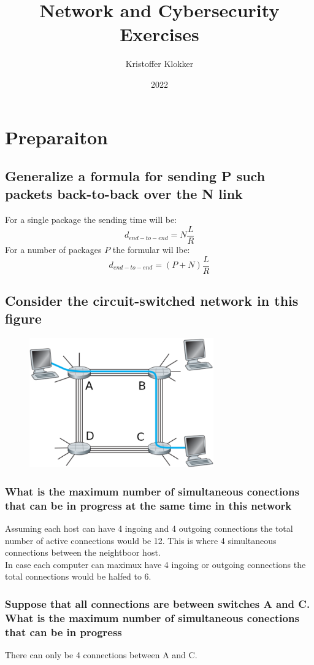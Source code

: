 \documentclass[12pt, a4paper]{article}
\title{Network and Cybersecurity\\ Exercises}
\date{2022}
\author{Kristoffer Klokker}
\begin{document}
	\maketitle
	\clearpage
	\tableofcontents
	\clearpage
	\section{Preparaiton}
		\subsection{Generalize a formula for sending P such packets back-to-back over the N link}
			For a single package the sending time will be:
			$$d_{end-to-end}=N\frac{L}{R}$$
			For a number of packages $P$ the formular wil lbe:
			$$d_{end-to-end}=(P+N)\frac{L}{R}$$
		\subsection{Consider the circuit-switched network in this figure}
			\begin{figure}[h!]
				\includegraphics[width=300px]{assets/1.1.png}
				\center
			\end{figure}
			\subsubsection{What is the maximum number of simultaneous conections that can be in progress at the same time in this network}
				Assuming each host can have 4 ingoing and 4 outgoing connections the total number of active connections would be 12. This is where 4 simultaneous connections between the neightboor host.\\
				In case each computer can maximux have 4 ingoing or outgoing connections the total connections would be halfed to 6.
			\subsubsection{Suppose that all connections are between switches A and C. What is the maximum number of simultaneous conections that can be in progress}
				There can only be 4 connections between A and C.
\end{document}
